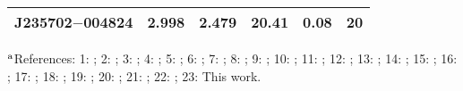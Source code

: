 \begin{table}
\begin{center}
{\begin{tabular}{lccccr}
 J235702$-$004824 &      2.998 &                    2.479 &                   20.41 &               0.08 &                20 \\
\hline
\end{tabular}
}
\end{center}
\begin{minipage}{\columnwidth}
{\footnotesize
$^{\rm a}$References:
1: \citet{Wolfe:1981:460};
2: \citet{Prochaska:1999:369};
3: \citet{Petitjean:2000:L26};
4: \citet{Dessauges-Zavadsky:2001:426};
5: \citet{Prochaska:2001:21};
6: \citet{Prochaska:2003:227};
7: \citet{Prochaska:2003:L9};
8: \citet{Peroux:2005:479};
9: \citet{Prochaska:2005:123};
10: \citet{Ledoux:2006:71};
11: \citet{Prochaska:2007:29};
12: \citet{Noterdaeme:2008:327};
13: \citet{Prochaska:2008:1002};
14: \citet{Wolfe:2008:881};
15: \citet{Noterdaeme:2009:1087};
16: \citet{Prochaska:2009:1543};
17: \citet{Ellison:2010:1435};
18: \citet{Penprase:2010:1};
19: \citet{Guimaraes:2012:147};
20: \citet{Zafar:2013:A141};
21: \citet{Ledoux:2015:A8};
22: \citet{Parks:2018:1151};
23: This work.
}
\end{minipage}
\end{table}
